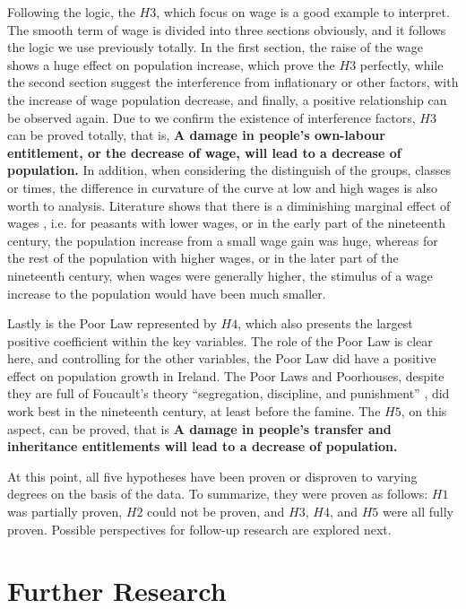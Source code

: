 Following the logic, the $H3$, which focus on wage is a good example to interpret. The smooth term of wage is divided into three sections obviously, and it follows the logic we use previously totally. In the first section, the raise of the wage shows a huge effect on population increase, which prove the $H3$ perfectly, while the second section suggest  the interference from inflationary or other factors, with the increase of wage population decrease, and finally, a positive relationship can be observed again. Due to we confirm the existence of interference factors, $H3$ can be proved totally, that is, \textbf{A damage in people's own-labour entitlement, or the decrease of wage, will lead to a decrease of population.} In addition, when considering the distinguish of the groups, classes or times, the difference in curvature of the curve at low and high wages is also worth to analysis. Literature shows that there is a diminishing marginal effect of wages \citep{li2012capital}, i.e. for peasants with lower wages, or in the early part of the nineteenth century, the population increase from a small wage gain was huge, whereas for the rest of the population with higher wages, or in the later part of the nineteenth century, when wages were generally higher, the stimulus of a wage increase to the population would have been much smaller.

Lastly is the Poor Law represented by $H4$, which also presents the largest positive coefficient within the key variables. The role of the Poor Law is clear here, and controlling for the other variables, the Poor Law did have a positive effect on population growth in Ireland. The Poor Laws and Poorhouses, despite they are full of Foucault's theory ``segregation, discipline, and punishment'' \citep{foucault2023discipline}, did work best in the nineteenth century, at least before the famine. The $H5$, on this aspect, can be proved, that is \textbf{A damage in people's transfer and inheritance entitlements will lead to a decrease of population.}

At this point, all five hypotheses have been proven or disproven to varying degrees on the basis of the data. To summarize, they were proven as follows: $H1$ was partially proven, $H2$ could not be proven, and $H3$, $H4$, and $H5$ were all fully proven. Possible perspectives for follow-up research are explored next.

\newpage

\section{Further Research}

